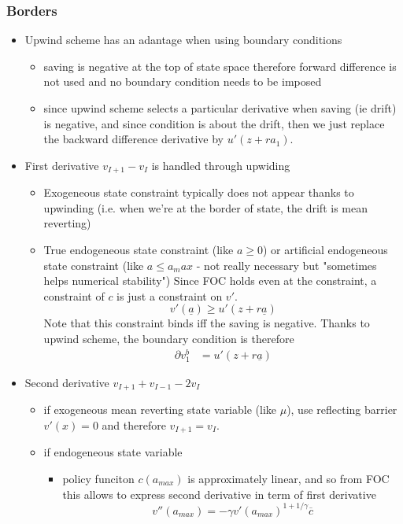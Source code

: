 \documentclass[english]{article}
\begin{document}
\subsubsection{Borders}
\begin{itemize}
	\item Upwind scheme has an adantage when using boundary conditions
	\begin{itemize}
		\item saving is negative at the top of state space therefore forward difference is not used and no boundary condition needs to be imposed
		\item since upwind scheme selects a particular derivative when saving (ie drift) is negative, and since condition is about the drift, then we just replace the backward difference derivative by $u'(z+ra_1)$.
	\end{itemize}
	\item First derivative $v_{I+1}-v_{I}$ is handled through upwiding
	\begin{itemize}
		\item Exogeneous state constraint typically does not appear thanks to upwinding (i.e. when we're at the border of state, the drift is mean reverting)
		\item True endogeneous state constraint (like $a \geq 0$) or artificial endogeneous state constraint (like $a \leq a_max$ - not really necessary but "sometimes helps numerical stability") 
		Since FOC holds even at the constraint,  a constraint of $c$ is just a constraint on $v'$.
		$$v'(\underline{a}) \geq u'(z+ r\underline{a})$$
		Note that this constraint binds iff the saving is negative. Thanks to upwind scheme, the boundary condition is therefore
		\begin{align*}
			\partial v^b_1&= u'(z+ r\underline{a})
		\end{align*}
	\end{itemize}
	\item Second derivative  $v_{I+1}+v_{I-1}-2v_{I}$
	\begin{itemize}
		\item if exogeneous mean reverting state variable (like $\mu$), use reflecting barrier $v'(x) = 0$ and therefore  $v_{I+1}=v_I$.
		\item if endogeneous state variable 
		\begin{itemize}
			\item policy funciton $c(a_{max})$ is approximately linear, and so from FOC this allows to express second derivative in term of first derivative 
			$$v''(a_{max}) = -\gamma v'(a_{max})^{1+1/\gamma} \overline{c}$$
		\end{itemize}
	\end{itemize}
\end{itemize}
\end{document}

